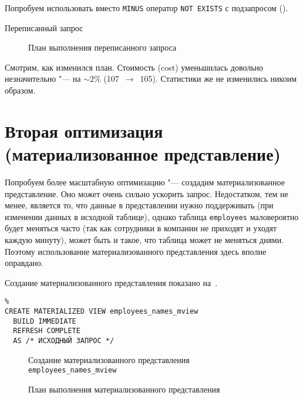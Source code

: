 Попробуем использовать вместо \texttt{MINUS} оператор \texttt{NOT EXISTS} с подзапросом ().

\begin{algorithm}[H]
  \caption{Переписанный запрос}
  \label{code-task-2-rewritten}
\end{algorithm}


\begin{figure}[H]%
  \caption{План выполнения переписанного запроса}
  \label{fig-task-2-rewrite-plan}
\end{figure}

Смотрим, как изменился план. Стоимость (cost) уменьшилась довольно незначительно "--- на $\sim 2$\% (107~$\to$~105).
Статистики же не изменились никоим образом.


\section{Вторая оптимизация (материализованное представление)}


Попробуем более масштабную оптимизацию "--- создадим материализованное представление.
Оно может очень сильно ускорить запрос.
Недостатком, тем не менее, является то, что данные в представлении нужно поддерживать (при изменении данных в исходной таблице), однако таблица \texttt{employees} маловероятно будет меняться часто (так как сотрудники в компании не приходят и уходят каждую минуту), может быть и такое, что таблица может не меняться днями. Поэтому использование материализованного представления здесь вполне оправдано.

Создание материализованного представления показано на~.

\begin{verbatim}%
CREATE MATERIALIZED VIEW employees_names_mview
  BUILD IMMEDIATE
  REFRESH COMPLETE
  AS /* ИСХОДНЫЙ ЗАПРОС */
\end{verbatim}
\begin{figure}[H]%
  \caption{Создание материализованного представления \texttt{employees\_names\_mview}}
  \label{jojo}
\end{figure}

\begin{figure}[H]%
  \caption{План выполнения материализованного представления}
  \label{fig-task-2-mview-plan}
\end{figure}

